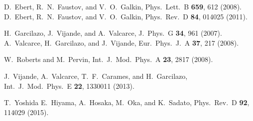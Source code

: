\documentclass[showkeys,aps,twocolumn,showpacs,preprintnumbers,amsmath,amssymb,prd,letterpaper,floatfix,nofootinbib,superscriptaddress,]{revtex4-1}
\begin{document}
{\begin{thebibliography}{99}
 D.~Ebert, R.~N.~Faustov, and V.~O.~Galkin,
Phys.\ Lett.\ B \textbf{659}, 612 (2008).
 D.~Ebert, R.~N.~Faustov, and V.~O.~Galkin,
Phys.\ Rev.\ D \textbf{84}, 014025 (2011).


 H.~Garcilazo, J.~Vijande, and A.~Valcarce,
J.\ Phys.\ G \textbf{34}, 961 (2007).
 A.~Valcarce, H.~Garcilazo, and J.~Vijande,
Eur.\ Phys.\ J.\ A \textbf{37}, 217 (2008).


 W.~Roberts and M.~Pervin,
Int.\ J.\ Mod.\ Phys.\ A \textbf{23}, 2817 (2008).


 J.~Vijande, A.~Valcarce, T.~F.~Carames, and H.~Garcilazo, %
Int.\ J.\ Mod.\ Phys.\ E \textbf{22}, 1330011 (2013).


 T.~Yoshida E.~Hiyama, A.~Hosaka, M.~Oka, and K.~Sadato, %
Phys.\ Rev.\ D \textbf{92}, 114029 (2015).


\end{thebibliography}}
\end{document}
